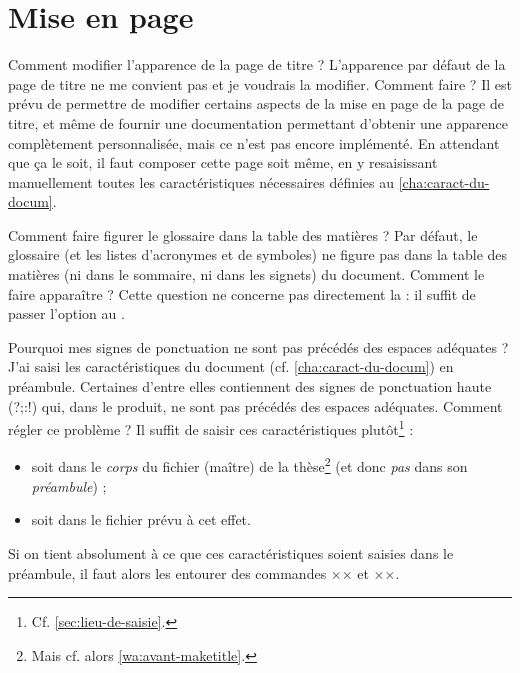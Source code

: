 \section{Mise en page}
\label{sec:mise-en-page}

\begin{dbfaq}{Comment modifier l'apparence de la page de titre ?}{}
  L'apparence par défaut de la page de titre ne me convient pas et je voudrais
  la modifier. Comment faire ?
  \tcblower
  Il est prévu de permettre de modifier certains aspects de la mise en page de
  la page de titre, et même de fournir une documentation permettant d'obtenir
  une apparence complètement personnalisée, mais ce n'est pas encore
  implémenté.  En attendant que ça le soit, il faut composer cette page soit
  même, en y resaisissant manuellement toutes les caractéristiques nécessaires
  définies au \vref{cha:caract-du-docum}.
\end{dbfaq}

\begin{dbfaq}{Comment faire figurer le glossaire dans la table des matières ?}{}
  Par défaut, le glossaire (et les listes d'acronymes et de symboles) ne figure
  pas dans la table des matières (ni dans le sommaire, ni dans les signets) du
  document. Comment le faire apparaître ?
  \tcblower
  Cette question ne concerne pas directement la \yatcl{} : il suffit de passer
  l'option  au .
\end{dbfaq}

\begin{dbfaq}{Pourquoi mes signes de ponctuation ne sont pas précédés
    des espaces adéquates ?}{}
  J'ai saisi les caractéristiques du document (cf. \vref{cha:caract-du-docum})
  en préambule. Certaines d'entre elles contiennent des signes de ponctuation
  haute ({\NoAutoSpacing?;:!}) qui, dans le \pdf produit, ne sont pas précédés
  des espaces adéquates. Comment régler ce problème ?
  \tcblower
  Il suffit de saisir ces caractéristiques
  plutôt\footnote{Cf. \vref{sec:lieu-de-saisie}.} :
  \begin{itemize}
  \item soit dans le \emph{corps} du fichier (maître) de la thèse\footnote{Mais
      cf. alors \vref{wa:avant-maketitle}.} (et donc \emph{pas} dans son
    \emph{préambule}) ;
  \item soit dans le fichier \file{\characteristicsfile} prévu à cet effet.
  \end{itemize}
  Si on tient absolument à ce que ces caractéristiques soient saisies dans le
  préambule, il faut alors les entourer des commandes ×× et
  ××.
\end{dbfaq}

